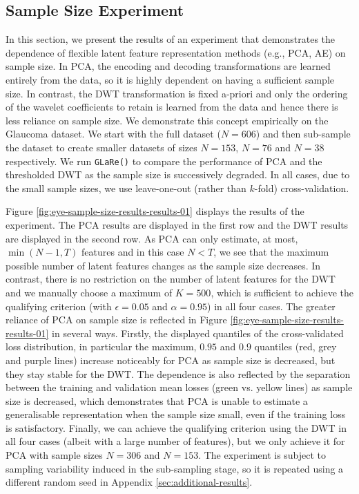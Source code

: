 \subsection{Sample Size Experiment}\label{sec:sample-size-experiment}

In this section, we present the results of an experiment that demonstrates the dependence of flexible latent feature representation methods (e.g., PCA, AE) on sample size.
In PCA, the encoding and decoding transformations are learned entirely from the data, so it is highly dependent on having a sufficient sample size.
In contrast, the DWT transformation is fixed a-priori and only the ordering of the wavelet coefficients to retain is learned from the data and hence there is less reliance on sample size.
We demonstrate this concept empirically on the Glaucoma dataset. 
We start with the full dataset ($N=606$) and then sub-sample the dataset to create smaller datasets of sizes $N=153$, $N=76$ and $N=38$ respectively.
We run \texttt{GLaRe()} to compare the performance of PCA and the thresholded DWT as the sample size is successively degraded.
In all cases, due to the small sample sizes, we use leave-one-out (rather than $k$-fold) cross-validation.

Figure \ref{fig:eye-sample-size-results-results-01} displays the results of the experiment.
The PCA results are displayed in the first row and the DWT results are displayed in the second row.
As PCA can only estimate, at most, $\min(N-1, T)$ features and in this case $N<T$, we see that the maximum possible number of latent features changes as the sample size decreases.
In contrast, there is no restriction on the number of latent features for the DWT and we manually choose a maximum of $K=500$, which is sufficient to achieve the qualifying criterion (with $\epsilon=0.05$ and $\alpha=0.95$) in all four cases.
The greater reliance of PCA on sample size is reflected in Figure \ref{fig:eye-sample-size-results-results-01} in several ways.
Firstly, the displayed quantiles of the cross-validated loss distribution, in particular the maximum, $0.95$ and $0.9$ quantiles (red, grey and purple lines) increase noticeably for PCA as sample size is decreased, but they stay stable for the DWT.
The dependence is also reflected by the separation between the training and validation mean losses (green vs. yellow lines) as sample size is decreased, which demonstrates that PCA is unable to estimate a generalisable representation when the sample size small, even if the training loss is satisfactory.
Finally, we can achieve the qualifying criterion using the DWT in all four cases (albeit with a large number of features), but we only achieve it for PCA with sample sizes $N=306$ and $N=153$.
The experiment is subject to sampling variability induced in the sub-sampling stage, so it is repeated using a different random seed in Appendix \ref{sec:additional-results}.

